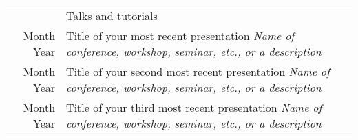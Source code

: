 \documentclass[letterpaper, 11pt]{article}
\newcommand{\headingfont}{\Large\color{Red}}
\newenvironment{SectionTable}[1]{
	\renewcommand*{\arraystretch}{1.7}
	\setlength{\tabcolsep}{10pt}
	\begin{longtable}{Rp{5.2in}} & #1 \\}
	{\end{longtable}\vspace{-.3cm}}
\begin{document}
	
		
		
	
	
	\begin{SectionTable}{\headingfont Talks and tutorials}
		Month Year &
		Title of your most recent presentation \newline
		\textit{Name of conference, workshop, seminar, etc., or a description} \\
		
		Month Year &
		Title of your second most recent presentation \newline
		\textit{Name of conference, workshop, seminar, etc., or a description} \\
		
		Month Year &
		Title of your third most recent presentation \newline
		\textit{Name of conference, workshop, seminar, etc., or a description} \\
	\end{SectionTable}
	
	
\end{document}
